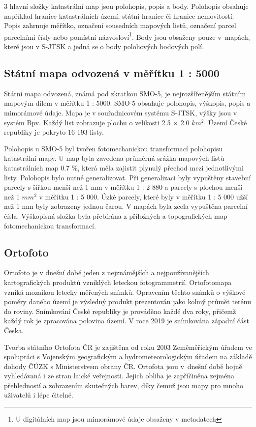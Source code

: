 \documentclass[thesis=M,czech]{FITthesis}[2012/06/26]
\begin{document}
3 hlavní složky katastrální map jsou polohopis, popis a body. Polohopis obsahuje například hranice katastrálních území, státní hranice či hranice nemovitostí. Popis zahrnuje měřítko, označení sousedních mapových listů, označení parcel parcelními čísly nebo pomístní názvosloví\footnote{U digitálních map jsou mimorámové údaje obsaženy v metadatech}. Body jsou obsaženy pouze v~mapách, které jsou v S-JTSK a jedná se o body polohových bodových polí. \cite{cuzk}

\subsection{Státní mapa odvozená v měřítku 1 : 5000}
Státní mapa odvozená, známá pod zkratkou SMO-5, je nejrozšířenějším státním mapovým dílem v měřítku 1 : 5000. SMO-5 obsahuje polohopis, výškopis, popis a mimorámové údaje. Mapa je v souřadnicovém systému S-JTSK, výšky jsou v systém Bpv. Každý list zobrazuje plochu o velikosti 2.5 $\times$ 2.0 $km^{2}$. Území České republiky je pokryto 16 193 listy. 

Polohopis u SMO-5 byl tvořen fotomechanickou transformací polohopisu katastrální mapy. U map byla zavedena průměrná srážka mapových listů katastrálních map 0.7 \%, která měla zajistit plynulý přechod mezi jednotlivými listy. Polohopis bylo nutné generalizovat. Při generalizaci byly vypuštěny stavební parcely s šířkou menší než 1 mm v měřítku 1 : 2 880 a parcely s plochou menší než 1 $mm^{2}$ v měřítku 1 : 5 000. Úzké parcely, které byly v měřítku 1 : 5 000 užší než 1 mm byly zobrazeny jednou čarou. V mapách byla zcela vypuštěna parcelní čísla. Výškopisná složka byla přebírána z příložných a topografických map fotomechanickou transformací. \cite{cuzk} \cite{smo5_bp}




\subsection{Ortofoto}
Ortofoto je v dnešní době jeden z nejznámějších a nejpoužívanějších kartografických produktů vzniklých leteckou fotogrammetrií. Ortofotomapa vzniká mozaikou letecky měřených snímků. Opravením těchto snímků o výškové poměry daného území je výsledný produkt prezentován jako kolmý průmět terénu do roviny. Snímkování České republiky je prováděno každé dva roky, přičemž každý rok je zpracována polovina území. V roce 2019 je snímkována západní část Česka.

Tvorba státního Ortofota ČR je zajištěna od roku 2003 Zeměměřickým úřadem ve spolupráci s Vojenským geografickým a hydrometeorologickým úřadem na základě dohody ČÚZK s Ministerstvem obrany ČR. Ortofota jsou v~dnešní době hojně vyhledávaná i ze stran laické veřejnosti. Jejich obliba je zapříčiněna zejména přehledností a zobrazením skutečných barev, díky čemuž jsou mapy pro mnoho uživatelů i lépe čitelné. \cite{cuzk} \cite{ortofoto}
\end{document}
